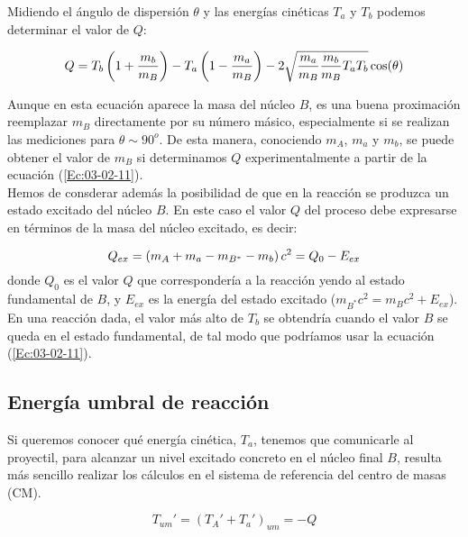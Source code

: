 Midiendo el ángulo de dispersión $\theta$ y las energías cinéticas $T_a$ y $T_b$ podemos determinar el valor de $Q$:
\begin{mybox}
\begin{equation}
	Q = T_b \left( 1+\frac{m_b}{m_B} \right) - T_a \left( 1-\frac{m_a}{m_B} \right) - 2 \sqrt{\frac{m_a}{m_B} \frac{m_b}{m_B} T_a T_b} \cos (\theta)  \label{Ec:03-02-11}
\end{equation}
\end{mybox}
Aunque en esta ecuación aparece la masa del núcleo $B$, es una buena proximación reemplazar $m_B$ directamente por su número másico, especialmente si se realizan las mediciones para $\theta \sim 90^{\textit{o}}$. De esta manera, conociendo $m_A$, $m_a$ y $m_b$, se puede obtener el valor de $m_B$ si determinamos $Q$ experimentalmente a partir de la ecuación (\ref{Ec:03-02-11}). \\

Hemos de consderar además la posibilidad de que en la reacción se produzca un estado excitado del núcleo $B$. En este caso el valor $Q$ del proceso debe expresarse en términos de la masa del núcleo excitado, es decir:

\begin{equation}
	Q_{ex} = \left( m_A+m_a-m_{B^*} -m_b \right)c^2 = Q_0 - E_{ex}
\end{equation}
donde $Q_0$ es el valor $Q$ que correspondería a la reacción yendo al estado fundamental de $B$, y $E_{ex}$ es la energía del estado excitado ($m_{B^*} c^2 = m_Bc^2 + E_{ex}$). En una reacción dada, el valor más alto de $T_b$ se obtendría cuando el valor $B$ se queda en el estado fundamental, de tal modo que podríamos usar la ecuación (\ref{Ec:03-02-11}).


\subsection{Energía umbral de reacción}

Si queremos conocer qué energía cinética, $T_a$, tenemos que comunicarle al proyectil, para alcanzar un nivel excitado concreto en el núcleo final $B$, resulta más sencillo realizar los cálculos en el sistema de referencia del centro de masas (CM).  

\begin{mybox}
	\begin{equation}
		T_{um}' = (T_A'+T_a')_{um} = - Q
	\end{equation}	
\end{mybox}

